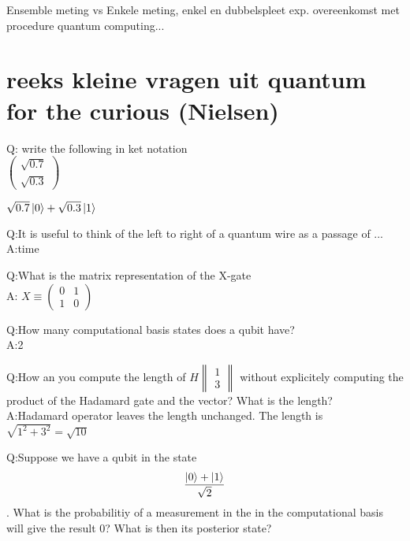 \documentclass[a4paper, addpoints, 12pt
    , noanswers    %
    ]{exam}
\begin{document}
\begin{questions}

\question[]
Ensemble meting vs Enkele meting, enkel en dubbelspleet exp. overeenkomst met procedure quantum computing...

\section*{reeks kleine vragen uit quantum for the curious (Nielsen)}
Q: write the following in ket notation\\
$\begin{pmatrix}
\sqrt{0.7}\\
\sqrt{0.3}
\end{pmatrix}
$

$\sqrt{0.7} \ket{0}+\sqrt{0.3}\ket{1}$


Q:It is useful to think of the left to right of a quantum wire as a passage of ...
\\
A:time

Q:What is the matrix representation of the X-gate\\
A:
$X \equiv \begin{pmatrix}
0&1\\
1&0
\end{pmatrix}
$

Q:How many computational basis states does a qubit have?\\
A:2

Q:How an you compute the length of
$H\begin{Vmatrix}
1\\
3
\end{Vmatrix}
$
without explicitely computing the product of the Hadamard gate and the vector?
What is the length?\\

A:Hadamard operator leaves the length unchanged. The length is $\sqrt{1^2+3^2}=\sqrt{10}$

Q:Suppose we have a qubit in the state
$$\frac{\ket{0}+\ket{1}}{\sqrt{2}}$$. What is the probabilitiy of a measurement in the in the computational basis will give the result 0? What is then its posterior state? 


\end{questions}
\end{document}
